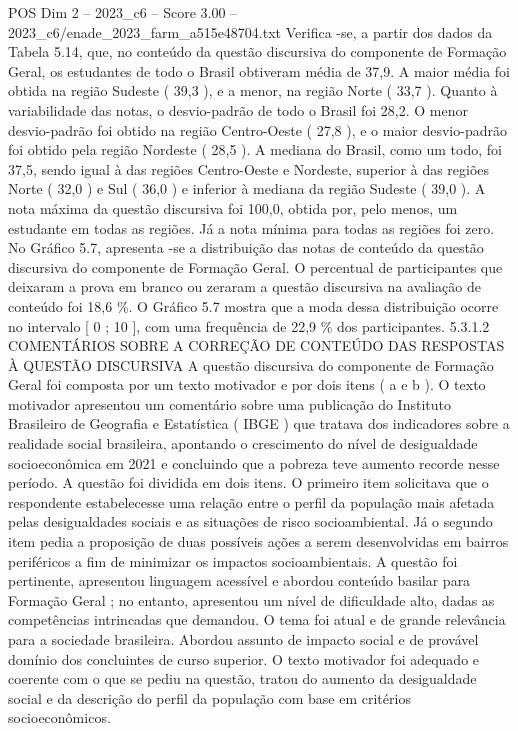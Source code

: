 \begin{textsample}{POS Dim 2 – 2023\_c6 – Score 3.00 – 2023\_c6/enade\_2023\_farm\_a515e48704.txt}
Verifica -se, a partir dos dados da Tabela 5.14, que, no conteúdo da questão discursiva do componente de Formação Geral, os estudantes de todo o Brasil obtiveram média de 37,9.
A maior média foi obtida na região Sudeste ( 39,3 ), e a menor, na região Norte ( 33,7 ).
Quanto à variabilidade das notas, o desvio-padrão de todo o Brasil foi 28,2.
O menor desvio-padrão foi obtido na região Centro-Oeste ( 27,8 ), e o maior desvio-padrão foi obtido pela região Nordeste ( 28,5 ).
A mediana do Brasil, como um todo, foi 37,5, sendo igual à das regiões Centro-Oeste e Nordeste, superior à das regiões Norte ( 32,0 ) e Sul ( 36,0 ) e inferior à mediana da região Sudeste ( 39,0 ).
A nota máxima da questão discursiva foi 100,0, obtida por, pelo menos, um estudante em todas as regiões.
Já a nota mínima para todas as regiões foi zero.
No Gráfico 5.7, apresenta -se a distribuição das notas de conteúdo da questão discursiva do componente de Formação Geral.
O percentual de participantes que deixaram a prova em branco ou zeraram a questão discursiva na avaliação de conteúdo foi 18,6 \%.
O Gráfico 5.7 mostra que a moda dessa distribuição ocorre no intervalo [ 0 ; 10 ], com uma frequência de 22,9 \% dos participantes. 5.3.1.2 COMENTÁRIOS SOBRE A CORREÇÃO DE CONTEÚDO DAS RESPOSTAS À QUESTÃO DISCURSIVA A questão discursiva do componente de Formação Geral foi composta por um texto motivador e por dois itens ( a e b ).
O texto motivador apresentou um comentário sobre uma publicação do Instituto Brasileiro de Geografia e Estatística ( IBGE ) que tratava dos indicadores sobre a realidade social brasileira, apontando o crescimento do nível de desigualdade socioeconômica em 2021 e concluindo que a pobreza teve aumento recorde nesse período.
A questão foi dividida em dois itens.
O primeiro item solicitava que o respondente estabelecesse uma relação entre o perfil da população mais afetada pelas desigualdades sociais e as situações de risco socioambiental.
Já o segundo item pedia a proposição de duas possíveis ações a serem desenvolvidas em bairros periféricos a fim de minimizar os impactos socioambientais.
A questão foi pertinente, apresentou linguagem acessível e abordou conteúdo basilar para Formação Geral ; no entanto, apresentou um nível de dificuldade alto, dadas as competências intrincadas que demandou.
O tema foi atual e de grande relevância para a sociedade brasileira.
Abordou assunto de impacto social e de provável domínio dos concluintes de curso superior.
O texto motivador foi adequado e coerente com o que se pediu na questão, tratou do aumento da desigualdade social e da descrição do perfil da população com base em critérios socioeconômicos.

\end{textsample}
